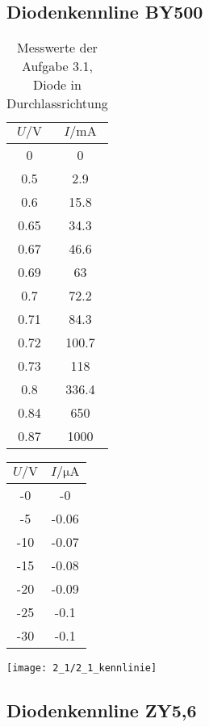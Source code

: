 \documentclass[a4paper, 12pt]{article}
\begin{document}
\subsection{Diodenkennline BY500}
\begin{table}[H]
\begin{center}
\begin{tabular}{@{}c|c@{}}
\toprule
$U / \si{\volt}$    & $I / \si{\milli\ampere}$     \\ \midrule
0    & 0     \\
0.5  & 2.9   \\
0.6  & 15.8  \\
0.65 & 34.3  \\
0.67 & 46.6  \\
0.69 & 63    \\
0.7  & 72.2  \\
0.71 & 84.3  \\
0.72 & 100.7 \\
0.73 & 118   \\
0.8  & 336.4 \\
0.84 & 650   \\
0.87 & 1000  \\ \bottomrule
\end{tabular}
\end{center}
\caption{Messwerte der Aufgabe 3.1, Diode in Durchlassrichtung}
\end{table}

\begin{table}[H]
  \begin{center}
\begin{tabular}{@{}c|c@{}}
\toprule
$U / \si{\volt}$  & $I / \si{\micro\ampere}$    \\ \midrule
-0  & -0    \\
-5  & -0.06 \\
-10 & -0.07 \\
-15 & -0.08 \\
-20 & -0.09 \\
-25 & -0.1  \\
-30 & -0.1  \\ \bottomrule
\end{tabular}
  \end{center}
\end{table}

\begin{center}
 \texttt{[image: 2\_1/2\_1\_kennlinie]}
\end{center}

\subsection{Diodenkennline ZY5,6}
\end{document}

